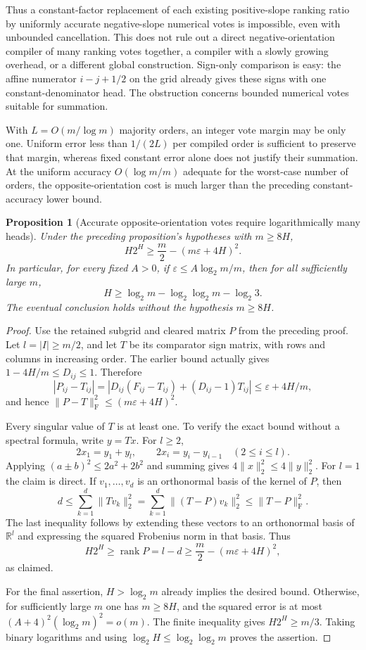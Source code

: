 \documentclass[11pt]{article}
\newtheorem{proposition}{Proposition}
\begin{document}
Thus a constant-factor replacement of each existing positive-slope
ranking ratio by uniformly accurate negative-slope numerical votes
is impossible, even with unbounded cancellation. This does not rule
out a direct negative-orientation compiler of many ranking votes
together, a compiler with a slowly growing overhead, or a different
global construction. Sign-only comparison is easy: the affine
numerator $i-j+1/2$ on the grid already gives these signs with one
constant-denominator head. The obstruction concerns bounded numerical
votes suitable for summation.

With $L=O(m/\log m)$ majority orders, an integer vote margin may
be only one. Uniform error less than $1/(2L)$ per compiled order
is sufficient to preserve that margin, whereas fixed constant
error alone does not justify their summation. At the uniform
accuracy $O(\log m/m)$ adequate for the worst-case number of orders,
the opposite-orientation cost is much larger than the preceding
constant-accuracy lower bound.

\begin{proposition}[Accurate opposite-orientation votes require logarithmically many heads]
Under the preceding proposition's hypotheses with $m\geq8H$,
\[
 H2^H\geq\frac m2-(m\varepsilon+4H)^2.
\]
In particular, for every fixed $A>0$, if
$\varepsilon\leq A\log_2m/m$, then for all sufficiently large $m$,
\[
 H\geq\log_2m-\log_2\log_2m-\log_2 3.
\]
The eventual conclusion holds without the hypothesis $m\geq8H$.
\end{proposition}
\begin{proof}
Use the retained subgrid and cleared matrix $P$ from the preceding
proof. Let $l=|I|\geq m/2$, and let $T$ be its comparator sign
matrix, with rows and columns in increasing order. The earlier
bound actually gives $1-4H/m\leq D_{ij}\leq1$. Therefore
\[
 |P_{ij}-T_{ij}|
 =|D_{ij}(F_{ij}-T_{ij})+(D_{ij}-1)T_{ij}|
 \leq\varepsilon+4H/m,
\]
and hence $\|P-T\|_{\mathrm F}^2\leq(m\varepsilon+4H)^2$.

Every singular value of $T$ is at least one. To verify the exact
bound without a spectral formula, write $y=Tx$. For $l\geq2$,
\[
 2x_1=y_1+y_l,\qquad 2x_i=y_i-y_{i-1}\quad(2\leq i\leq l).
\]
Applying $(a\pm b)^2\leq2a^2+2b^2$ and summing gives
$4\|x\|_2^2\leq4\|y\|_2^2$. For $l=1$ the claim is direct.
If $v_1,\ldots,v_d$ is an orthonormal basis of the kernel of
$P$, then
\[
 d\leq\sum_{k=1}^d\|Tv_k\|_2^2
   =\sum_{k=1}^d\|(T-P)v_k\|_2^2
   \leq\|T-P\|_{\mathrm F}^2.
\]
The last inequality follows by extending these vectors to an
orthonormal basis of $\mathbb R^l$ and expressing the squared
Frobenius norm in that basis. Thus
\[
 H2^H\geq\operatorname{rank}P=l-d
 \geq\frac m2-(m\varepsilon+4H)^2,
\]
as claimed.

For the final assertion, $H>\log_2m$ already implies the desired
bound. Otherwise, for sufficiently large $m$ one has $m\geq8H$,
and the squared error is at most
$(A+4)^2(\log_2m)^2=o(m)$. The finite inequality gives
$H2^H\geq m/3$. Taking binary logarithms and using
$\log_2H\leq\log_2\log_2m$ proves the assertion.
\end{proof}
\end{document}
